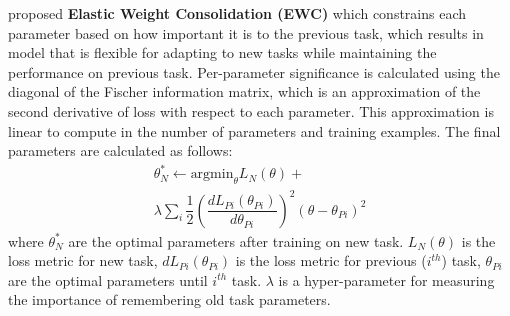 \documentclass[11pt,a4paper]{article}
\begin{document}
\citet{DBLP:journals/corr/KirkpatrickPRVD16} proposed \textbf{Elastic Weight Consolidation (EWC)} which constrains each parameter based on how important it is to the previous task, which results in model that is flexible for adapting to new tasks while maintaining the performance on previous task. Per-parameter significance is calculated using the diagonal of the Fischer information matrix, which is an approximation of the second derivative of loss with respect to each parameter. This approximation is linear to compute in the number of parameters and training examples. The final parameters are calculated as follows:
\begin{multline}
\theta_N^* \leftarrow \text{argmin}_{\theta} L_N (\theta) + \\ \lambda \sum_i \dfrac{1}{2}  (\dfrac{dL_{Pi} (\theta_{Pi})}{d\theta_{Pi}})^2 (\theta - \theta_{Pi})^2 
\label{eq:ewc}
\end{multline}
where $\theta_N^*$ are the optimal parameters after training on new task. $L_N (\theta)$ is the loss metric for new task, $dL_{Pi} (\theta_{Pi})$ is the loss metric for previous ($i^{th}$) task, $\theta_{Pi} $ are the optimal parameters until $i^{th}$ task. $\lambda$ is a hyper-parameter for measuring the importance of remembering old task parameters.
\end{document}
